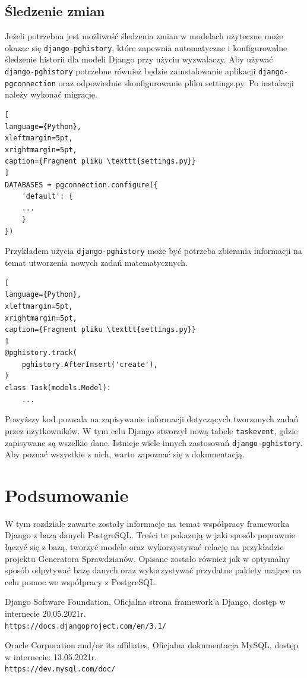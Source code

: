 \documentclass[oneside,polski,logo,indent]{amuthesis}
\begin{document}
\begin{enumerate}
\begin{enumerate}
\subsection{Śledzenie zmian}
Jeżeli potrzebna jest możliwość śledzenia zmian w modelach użyteczne może okazac się \texttt{django-pghistory}, które zapewnia automatyczne i konfigurowalne śledzenie historii dla modeli Django przy użyciu wyzwalaczy. Aby używać \texttt{django-pghistory} potrzebne również będzie zainstalowanie aplikacji \texttt{django-pgconnection} oraz odpowiednie skonfigurowanie pliku settings.py. Po instalacji należy wykonać migrację.
\begin{lstlisting}[
language={Python},
xleftmargin=5pt,
xrightmargin=5pt,
caption={Fragment pliku \texttt{settings.py}}
]
DATABASES = pgconnection.configure({
    'default': {
	...
    }
})
\end{lstlisting}
Przykładem użycia \texttt{django-pghistory} może być potrzeba zbierania informacji na temat utworzenia nowych zadań matematycznych.
\begin{lstlisting}[
language={Python},
xleftmargin=5pt,
xrightmargin=5pt,
caption={Fragment pliku \texttt{settings.py}}
]
@pghistory.track(
    pghistory.AfterInsert('create'),
)
class Task(models.Model):
	...
\end{lstlisting}
Powyższy kod pozwala na zapisywanie informacji dotyczących tworzonych zadań przez użytkowników. W tym celu Django stworzył nową tabele \texttt{taskevent}, gdzie zapisywane są wszelkie dane.
Istnieje wiele innych zastosowań \texttt{django-pghistory}. Aby poznać wszystkie z nich, warto zapoznać się z dokumentacją.
\section{Podsumowanie}
W tym rozdziale zawarte zostały informacje na temat współpracy frameworka Django z bazą danych PostgreSQL. Treści te pokazują w jaki sposób poprawnie łączyć się z bazą, tworzyć modele oraz wykorzystywać relację na przykładzie projektu Generatora Sprawdzianów. Opisane zostało również jak w optymalny sposób odpytywać bazę danych oraz wykorzystywać przydatne pakiety mające na celu pomoc we współpracy z PostgreSQL.
\begin{thebibliography}{9}
Django Software Foundation, Oficjalna strona framework’a Django, dostęp w internecie 20.05.2021r.
\\\texttt{https://docs.djangoproject.com/en/3.1/}


Oracle Corporation and/or its affiliates, Oficjalna dokumentacja MySQL, dostęp w internecie: 13.05.2021r.
\\\texttt{https://dev.mysql.com/doc/}



\end{thebibliography}
\end{enumerate}
\end{enumerate}
\end{document}
